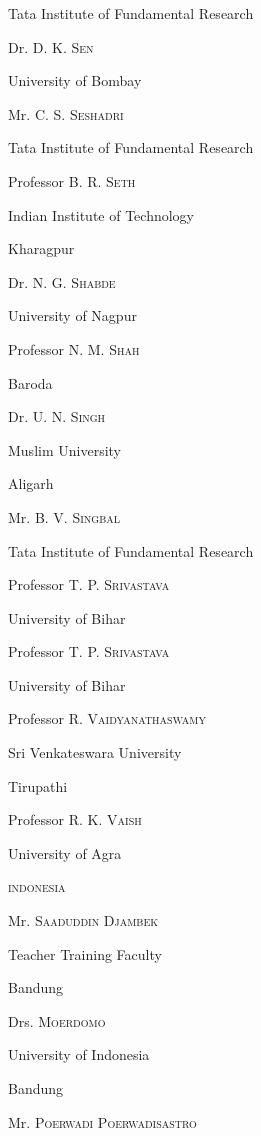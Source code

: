 \quad Tata Institute of Fundamental Research
\smallskip

\quad Dr. \textsc{D. K. Sen}

\quad University of Bombay
\smallskip

\quad Mr. \textsc{C. S. Seshadri}

\quad Tata Institute of Fundamental Research
\smallskip

\quad Professor \textsc{B. R. Seth}

\quad Indian Institute of Technology

\quad Kharagpur
\smallskip

\quad Dr. \textsc{N. G. Shabde}

\quad University of Nagpur
\smallskip

\quad Professor \textsc{N. M. Shah}

\quad Baroda
\smallskip

\quad Dr. \textsc{U. N. Singh}

\quad Muslim University

\quad Aligarh
\smallskip

\quad Mr. \textsc{B. V. Singbal}

\quad Tata Institute of Fundamental Research
\smallskip

\quad Professor \textsc{T. P. Srivastava}

\quad University of Bihar
\smallskip

\quad Professor \textsc{T. P. Srivastava}\pageoriginale

\quad University of Bihar
\smallskip

\quad Professor \textsc{R. Vaidyanathaswamy}

\quad Sri Venkateswara University

\quad Tirupathi
\smallskip

\quad Professor \textsc{R. K. Vaish}

\quad University of Agra
\medskip

\noindent
\textsc{indonesia}

\quad Mr. \textsc{Saaduddin Djambek}

\quad Teacher Training Faculty

\quad Bandung
\smallskip

\quad Drs. \textsc{Moerdomo}

\quad University of Indonesia

\quad Bandung
\smallskip

\quad Mr. \textsc{Poerwadi Poerwadisastro}

